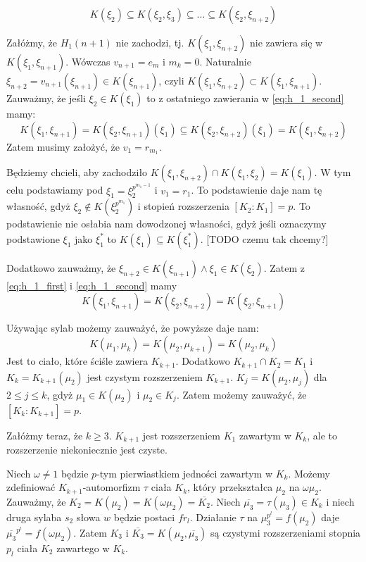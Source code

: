 \begin{equation}
  K\left(\xi_2\right) \subseteq
  K\left(\xi_2, \xi_3\right) \subseteq
  \ldots \subseteq
  K\left(\xi_2, \xi_{n+2}\right)
  \label{eq:h_1_second}
\end{equation}

Załóżmy, że $H_1(n+1)$ nie zachodzi, tj. $K\left(\xi_1, \xi_{n+2}\right)$ nie
zawiera się w $K\left(\xi_1, \xi_{n+1}\right)$. Wówczas $v_{n+1} = e_m$ i $m_k =
0$.
Naturalnie $\xi_{n+2} = v_{n+1}\left(\xi_{n+1}\right) \in
K\left(\xi_{n+1}\right)$, czyli $K\left(\xi_1, \xi_{n+2}\right) \subset
K\left(\xi_1, \xi_{n+1}\right)$.
Zauważmy, że jeśli $\xi_2 \in K\left(\xi_1\right)$ to z ostatniego zawierania w
\ref{eq:h_1_second} mamy:
\[
  K\left(\xi_1, \xi_{n+1}\right) =
  K\left(\xi_2, \xi_{n+1}\right)\left(\xi_1\right) \subseteq
  K\left(\xi_2, \xi_{n+2}\right)\left(\xi_1\right) =
K\left(\xi_1, \xi_{n+2}\right)\]
Zatem musimy założyć, że $v_1 = r_{m_1}$.

Będziemy chcieli, aby zachodziło $K\left(\xi_1, \xi_{n+2}\right) \cap
K\left(\xi_1, \xi_2\right) = K\left(\xi_1\right)$. W tym celu podstawiamy pod
$\xi_1 = \xi_2^{p^{m_1-1}}$ i $v_1 = r_1$. To podstawienie daje nam tę własność,
gdyż $\xi_2 \not \in K\left(\xi_2^{p^{m_1}}\right)$ i stopień rozszerzenia
$\left[K_2 : K_1\right] = p$. To podstawienie nie osłabia nam dowodzonej
własności, gdyż jeśli oznaczymy podstawione $\xi_1$ jako $\xi_1^*$ to
$K\left(\xi_1\right) \subseteq K\left(\xi_1^*\right)$.
[TODO czemu tak chcemy?]

Dodatkowo zauważmy, że
$\xi_{n+2} \in K\left(\xi_{n+1}\right) \land \xi_{1} \in K\left(\xi_{2}\right)$.
Zatem z \ref{eq:h_1_first} i \ref{eq:h_1_second} mamy
\[
  K\left(\xi_1, \xi_{n+1}\right) =
  K\left(\xi_2, \xi_{n+2}\right) =
  K\left(\xi_2, \xi_{n+1}\right)
\]

Używając sylab możemy zauważyć, że powyższe daje nam:
\[
  K\left(\mu_1, \mu_{k}\right) =
  K\left(\mu_2, \mu_{k+1}\right) =
  K\left(\mu_2, \mu_{k}\right)
\]
Jest to ciało, które ściśle zawiera $K_{k+1}$. Dodatkowo $K_{k+1} \cap K_2 =
K_1$ i $K_k = K_{k+1}\left(\mu_2\right)$ jest czystym rozszerzeniem $K_{k+1}$.
$K_j = K\left(\mu_2, \mu_j\right)$ dla $2 \leq j \leq k$, gdyż $\mu_1 \in
K\left(\mu_2\right)$ i $\mu_2 \in K_j$. Zatem możemy zauważyć, że $\left[K_k :
K_{k+1}\right] = p$.

Załóżmy teraz, że $k \geq 3$. $K_{k+1}$ jest rozszerzeniem $K_1$ zawartym w
$K_k$, ale to rozszerzenie niekoniecznie jest czyste.

Niech $\omega \neq 1$ będzie $p$-tym pierwiastkiem jedności zawartym w $K_k$.
Możemy zdefiniować $K_{k+1}$-automorfizm $\tau$ ciała $K_k$, który przekształca
$\mu_2$ na $\omega \mu_2$.
Zauważmy, że $K_2 = K\left(\mu_2\right) = K\left(\omega \mu_2\right) =
\overline{K_2}$.
Niech $\overline{\mu_3} = \tau(\mu_3) \in K_k$ i niech druga sylaba $s_2$ słowa
$w$ będzie postaci $fr_l$.
Działanie $\tau$ na $\mu_3^{p^l} = f\left(\mu_2\right)$ daje
$\overline{\mu_3}^{p^l} = f\left(\omega\mu_2\right)$. Zatem $K_3$ i
$\overline{K_3} = K\left(\mu_2, \overline{\mu_3}\right)$ są czystymi
rozszerzeniami stopnia $p_l$ ciała $K_2$ zawartego w $K_k$.

